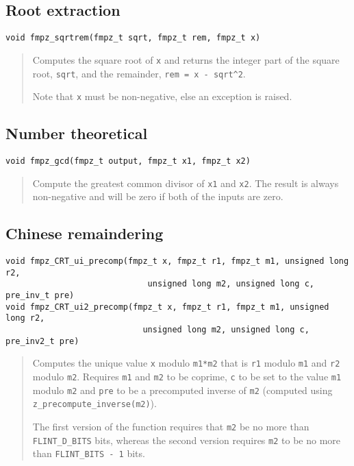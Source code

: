 \documentclass[a4paper,10pt]{article}
\newcommand{\code}{\lstinline}
\begin{document}
\subsection{Root extraction}

\begin{lstlisting}
void fmpz_sqrtrem(fmpz_t sqrt, fmpz_t rem, fmpz_t x)
\end{lstlisting}
\begin{quote}
Computes the square root of \code{x} and returns the integer part of the square root, \code{sqrt}, and the remainder, \code{rem = x - sqrt^2}. 

Note that \code{x} must be non-negative, else an exception is raised.
\end{quote}

\subsection{Number theoretical}

\begin{lstlisting}
void fmpz_gcd(fmpz_t output, fmpz_t x1, fmpz_t x2)
\end{lstlisting}
\begin{quote}
Compute the greatest common divisor of \code{x1} and \code{x2}. The result is always non-negative and will be zero if both of the inputs are zero.
\end{quote}

\subsection{Chinese remaindering}
\begin{lstlisting}
void fmpz_CRT_ui_precomp(fmpz_t x, fmpz_t r1, fmpz_t m1, unsigned long r2,
                             unsigned long m2, unsigned long c, pre_inv_t pre)
void fmpz_CRT_ui2_precomp(fmpz_t x, fmpz_t r1, fmpz_t m1, unsigned long r2,
                            unsigned long m2, unsigned long c, pre_inv2_t pre)
\end{lstlisting}
\begin{quote}
Computes the unique value \code{x} modulo \code{m1*m2} that is \code{r1} modulo \code{m1} and \code{r2} modulo \code{m2}. Requires \code{m1} and \code{m2} to be coprime, \code{c} to be set to the value \code{m1} modulo \code{m2} and \code{pre} to be a precomputed inverse of \code{m2} (computed using \code{z_precompute_inverse(m2)}). 

The first version of the function requires that \code{m2} be no more than \code{FLINT_D_BITS} bits, whereas the second version requires \code{m2} to be no more than \code{FLINT_BITS - 1} bits.
\end{quote}
\end{document}
